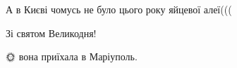  
 
 
 
 

\qqSecCmt


А в Києві чомусь не було цього року яйцевої алеї(((

Зі святом Великодня! 💖💞✨🐣


🌞 вона приїхала в Маріуполь.🙂

